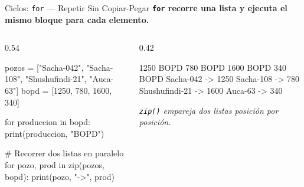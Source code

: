 \documentclass[aspectratio=169, 11pt]{beamer}
\begin{document}
\begin{frame}[fragile,shrink=10]{Ciclos: \texttt{for} --- Repetir Sin Copiar-Pegar}
  \vspace{-6pt}
  {\small\color{arcaDark}\bfseries
    \texttt{for} recorre una lista y ejecuta el mismo bloque para cada elemento.}

  \vspace{4pt}
  \begin{columns}[T]
    \begin{column}{0.54\textwidth}
      \begin{pyblock}
pozos = ["Sacha-042", "Sacha-108",
         "Shushufindi-21", "Auca-63"]
bopd = [1250, 780, 1600, 340]

for produccion in bopd:
    print(produccion, "BOPD")

# Recorrer dos listas en paralelo
for pozo, prod in zip(pozos, bopd):
    print(pozo, "->", prod)
      \end{pyblock}
    \end{column}

    \begin{column}{0.42\textwidth}
      \begin{outputblock}
1250 BOPD
780 BOPD
1600 BOPD
340 BOPD
Sacha-042 -> 1250
Sacha-108 -> 780
Shushufindi-21 -> 1600
Auca-63 -> 340
      \end{outputblock}

      \vspace{2pt}
      {\scriptsize\color{textMuted}\itshape
        \texttt{zip()} empareja dos listas
        posición por posición.}
    \end{column}
  \end{columns}
\end{frame}
\end{document}
